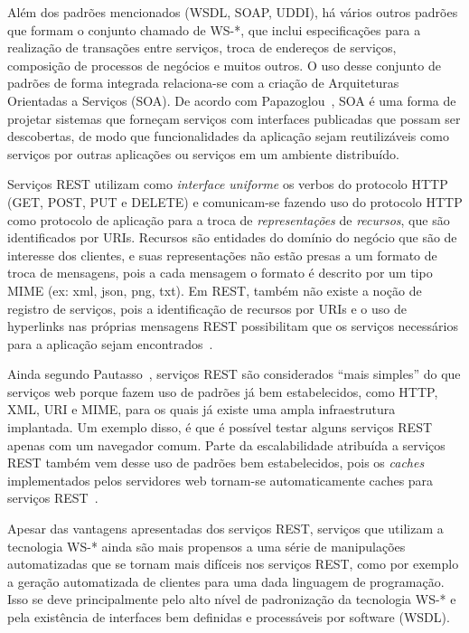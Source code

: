 Além dos padrões mencionados (WSDL, SOAP, UDDI), há vários outros padrões que formam o conjunto chamado de WS-*, que inclui especificações para a realização de transações entre serviços, troca de endereços de serviços, composição de processos de negócios e muitos outros. O uso desse conjunto de padrões de forma integrada relaciona-se com a criação de Arquiteturas Orientadas a Serviços (SOA). De acordo com Papazoglou~\cite{Papazoglou2007State}, SOA é uma forma de projetar sistemas que forneçam serviços com interfaces publicadas que possam ser descobertas, de modo que funcionalidades da aplicação sejam reutilizáveis como serviços por outras aplicações ou serviços em um ambiente distribuído. 

Serviços REST utilizam como \emph{interface uniforme} os verbos do protocolo HTTP (GET, POST, PUT e DELETE) e comunicam-se fazendo uso do protocolo HTTP como protocolo de aplicação para a troca de \emph{representações} de \emph{recursos}, que são identificados por URIs. Recursos são entidades do domínio do negócio que são de interesse dos clientes, e suas representações não estão presas a um formato de troca de mensagens, pois a cada mensagem o formato é descrito por um tipo MIME (ex: xml, json, png, txt). Em REST, também não existe a noção de registro de serviços, pois a identificação de recursos por URIs e o uso de hyperlinks nas próprias mensagens REST possibilitam que os serviços necessários para a aplicação sejam encontrados~\cite{Pautasso2008Restful}.

Ainda segundo Pautasso~\cite{Pautasso2008Restful}, serviços REST são considerados ``mais simples'' do que serviços web porque fazem uso de padrões já bem estabelecidos, como HTTP, XML, URI e MIME, para os quais já existe uma ampla infraestrutura implantada. Um exemplo disso, é que é possível testar alguns serviços REST apenas com um navegador comum. Parte da escalabilidade atribuída a serviços REST também vem desse uso de padrões bem estabelecidos, pois os \emph{caches} implementados pelos servidores web tornam-se automaticamente caches para serviços REST~\cite{Tong2010CXF}.

Apesar das vantagens apresentadas dos serviços REST, serviços que utilizam a tecnologia WS-* ainda são mais propensos a uma série de manipulações automatizadas que se tornam mais difíceis nos serviços REST, como por exemplo a geração automatizada de clientes para uma dada linguagem de programação. Isso se deve principalmente pelo alto nível de padronização da tecnologia WS-* e pela existência de interfaces bem definidas e processáveis por software (WSDL). 

